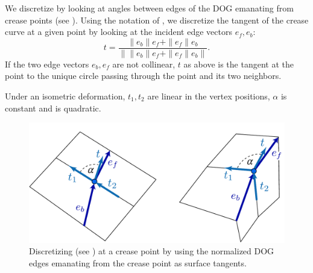 We discretize  by looking at angles between edges of the DOG emanating from crease points (see ). Using the notation of , we discretize the tangent of the crease curve at a given point by looking at the incident edge vectors $e_f, e_b$: 
\begin{equation} \label{eq:crease_tangent}
t = \frac{\|e_b\|e_f + \|e_f\|e_b}{\left\|\|e_b\|e_f + \|e_f\|e_b\right\|}.
\end{equation}
If the two edge vectors $e_b, e_f$ are not collinear, $t$ as above is the tangent at the point to the unique circle passing through the point and its two neighbors. 

Under an isometric deformation, $t_1,t_2$ are linear in the vertex positions, $\alpha$ is constant and   is quadratic.

\begin{figure} [t]
	\centering
	\includegraphics[width=0.8\linewidth]{figures/fold_angle_and_tangent_angles}
	\caption{Discretizing  (see ) at a crease point by using the normalized DOG edges emanating from the crease point as surface tangents.}
	\label{fig:fold_angle_and_tangent_angles}
\end{figure}

